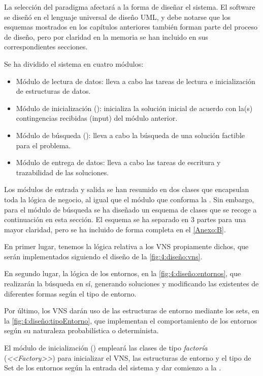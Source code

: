 La selección del paradigma afectará a la forma de diseñar el sistema. El software se diseñó en el lenguaje universal de diseño UML, y debe notarse que los esquemas mostrados en los capítulos anteriores también forman parte del proceso de diseño, pero por claridad en la memoria se han incluido en sus correspondientes secciones.

Se ha dividido el sistema en cuatro módulos:
\begin{itemize}
	\item Módulo de lectura de datos: lleva a cabo las tareas de lectura e inicialización de estructuras de datos.
	\item Módulo de inicialización (\faseuno{}): inicializa la solución inicial de acuerdo con la(s) contingencias recibidas (input) del módulo anterior.
	\item Módulo de búsqueda (\fasedos{}): lleva a cabo la búsqueda de una solución factible para el problema.
	\item Módulo de entrega de datos: lleva a cabo las tareas de escritura y trazabilidad de las soluciones.
\end{itemize}

Los módulos de entrada y salida se han resumido en dos clases que encapsulan toda la lógica de negocio, al igual que el módulo que conforma la \faseuno{}. Sin embargo, para el módulo de búsqueda se ha diseñado un esquema de clases que se recoge a continuación en esta sección. El esquema se ha separado en 3 partes para una mayor claridad, pero se ha incluido de forma completa en el \autoref{Anexo:B}. 

En primer lugar, tenemos la lógica relativa a los VNS propiamente dichos, que serán implementados siguiendo el diseño de la \autoref{fig:4:diseño:vns}.

En segundo lugar, la lógica de los entornos, en la \autoref{fig:4:diseño:entornos}, que realizarán la búsqueda en sí, generando soluciones y modificando las existentes de diferentes formas según el tipo de entorno.

Por último, los VNS darán uso de las estructuras de entorno mediante los sets, en la \autoref{fig:4:diseño:tipoEntorno}, que implementan el comportamiento de los entornos según su naturaleza probabilística o determinista.

El módulo de inicialización (\faseuno{}) empleará las clases de tipo \textit{factoría} (\textit{<<Factory>>}) para inicializar el VNS, las estructuras de entorno y el tipo de Set de los entornos según la entrada del sistema y dar comienzo a la \faseuno{}.

